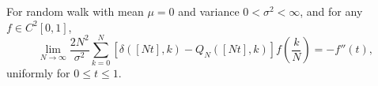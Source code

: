 For random walk with mean \(\mu = 0\) and variance \(0 < \sigma^2 < \infty\), and for any \(f \in C^2[0,1]\),
\[
\lim_{N \to \infty} \frac{2N^2}{\sigma^2} \sum_{k=0}^{N} [\delta([Nt],k) - Q_N([Nt],k)] f\!\left(\frac{k}{N}\right) = -f''(t),
\]
uniformly for \(0 \leq t \leq 1\).
